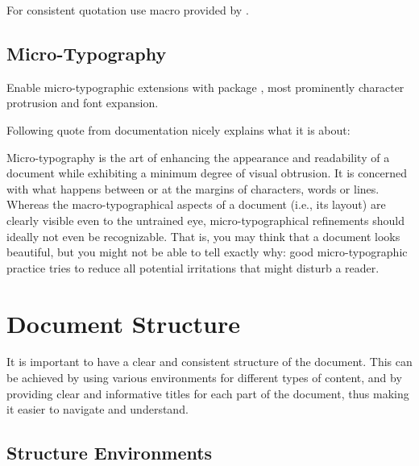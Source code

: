 For consistent quotation use \macro{\enquote} macro provided by .

\subsection{\texorpdfstring{Micro-\!Typography}{Micro-Typography}}%
\label{sub:Micro-Typography}

Enable micro-typographic extensions with package , most prominently character protrusion and font expansion.

Following quote from  documentation nicely explains what it is about:
\begin{displayquote}
    Micro-typography is the art of enhancing the appearance and readability of a document while exhibiting a minimum degree of visual obtrusion.
    It is concerned with what happens between or at the margins of characters, words or lines.
    Whereas the macro-typographical aspects of a document (i.e., its layout) are clearly visible even to the untrained eye, micro-typographical refinements should ideally not even be recognizable.
    That is, you may think that a document looks beautiful, but you might not be able to tell exactly why: good micro-typographic practice tries to reduce all potential irritations that might disturb a reader.
\end{displayquote}


\section{Document Structure}%
\label{sec:Document Structure}

It is important to have a clear and consistent structure of the document.
This can be achieved by using various environments for different types of content, and by providing clear and informative titles for each part of the document, thus making it easier to navigate and understand.

\subsection{Structure Environments}%
\label{sub:Structure Environments}

